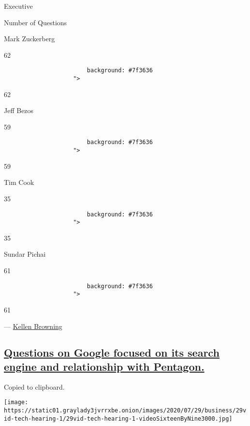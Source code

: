 Executive

Number of Questions

Mark Zuckerberg

62

\begin{verbatim}
                        background: #7f3636
                    ">
\end{verbatim}

62

Jeff Bezos

59

\begin{verbatim}
                        background: #7f3636
                    ">
\end{verbatim}

59

Tim Cook

35

\begin{verbatim}
                        background: #7f3636
                    ">
\end{verbatim}

35

Sundar Pichai

61

\begin{verbatim}
                        background: #7f3636
                    ">
\end{verbatim}

61

--- \href{https://www.nytimes3xbfgragh.onion/by/kellen-browning}{Kellen
Browning}

\hypertarget{questions-on-google-focused-on-its-search-engine-and-relationship-with-pentagon}{%
\subsection{\texorpdfstring{\protect\hyperlink{questions-on-google-focused-on-its-search-engine-and-relationship-with-pentagon}{Questions
on Google focused on its search engine and relationship with
Pentagon.}}{Questions on Google focused on its search engine and relationship with Pentagon.}}\label{questions-on-google-focused-on-its-search-engine-and-relationship-with-pentagon}}

Copied to clipboard.

\texttt{[image: https://static01.graylady3jvrrxbe.onion/images/2020/07/29/business/29vid-tech-hearing-1/29vid-tech-hearing-1-videoSixteenByNine3000.jpg]}

